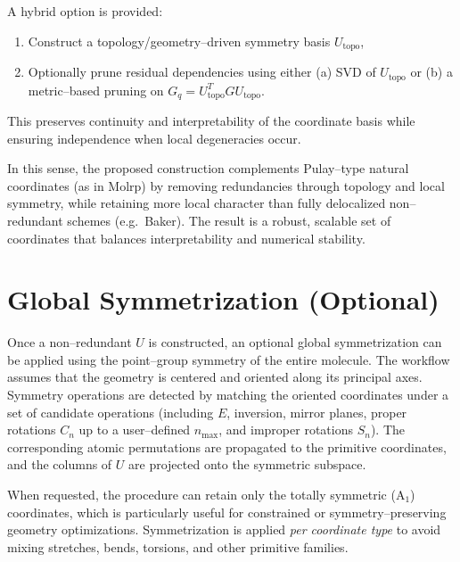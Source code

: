 \documentclass[11pt,a4paper]{article}
\begin{document}
A hybrid option is provided:
\begin{enumerate}
  \item Construct a topology/geometry--driven symmetry basis $U_{\mathrm{topo}}$,
  \item Optionally prune residual dependencies using either
        (a) SVD of $U_{\mathrm{topo}}$ or
        (b) a metric--based pruning on $G_q = U_{\mathrm{topo}}^T G U_{\mathrm{topo}}$.
\end{enumerate}

This preserves continuity and interpretability of the coordinate basis while
ensuring independence when local degeneracies occur.

In this sense, the proposed construction complements Pulay--type natural
coordinates (as in Molrp)\cite{pulay_natural,molrp} by removing redundancies through topology and local
symmetry, while retaining more local character than fully delocalized
non--redundant schemes (e.g.\ Baker).\cite{baker_deloc} The result is a robust, scalable set of
coordinates that balances interpretability and numerical stability.

\section{Global Symmetrization (Optional)}

Once a non--redundant $U$ is constructed, an optional global symmetrization can
be applied using the point--group symmetry of the entire molecule. The workflow
assumes that the geometry is centered and oriented along its principal axes.
Symmetry operations are detected by matching the oriented coordinates under a
set of candidate operations (including $E$, inversion, mirror planes, proper
rotations $C_n$ up to a user--defined $n_{\max}$, and improper rotations $S_n$).
The corresponding atomic permutations are propagated to the primitive
coordinates, and the columns of $U$ are projected onto the symmetric subspace.

When requested, the procedure can retain only the totally symmetric (A$_1$)
coordinates, which is particularly useful for constrained or symmetry--preserving
geometry optimizations. Symmetrization is applied \emph{per coordinate type}
to avoid mixing stretches, bends, torsions, and other primitive families.\cite{cotton_group}
\end{document}
